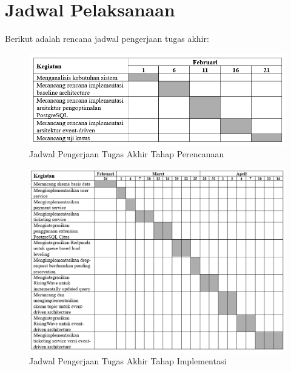 \section{Jadwal Pelaksanaan}

Berikut adalah rencana jadwal pengerjaan tugas akhir:

\begin{figure}[ht]
    \centering
    \includegraphics[width=1\textwidth]{resources/schedule/jadwal-1.png}
    \caption{Jadwal Pengerjaan Tugas Akhir Tahap Perencanaan}
    \label{fig:jadwal pelaksanaan perencanaan}
\end{figure}

\begin{figure}[ht]
    \centering
    \includegraphics[width=1\textwidth]{resources/schedule/jadwal-2.png}
    \caption{Jadwal Pengerjaan Tugas Akhir Tahap Implementasi}
    \label{fig:jadwal pelaksanaan implementasi}
\end{figure}

\pagebreak

